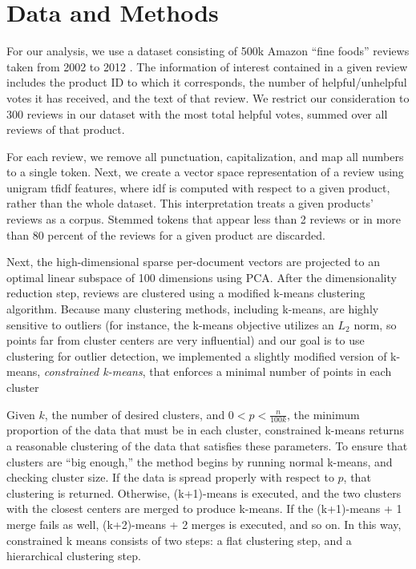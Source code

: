 \documentclass[10pt]{article}
\begin{document}
\section*{Data and Methods}
For our analysis, we use a dataset consisting of 500k Amazon ``fine foods'' reviews taken from 2002 to 2012 \cite{mcauley2013amateurs}. The information of interest contained in a given review includes the product ID to which it corresponds, the number of helpful/unhelpful votes it has received, and the text of that review. We restrict our consideration to 300 reviews in our dataset with the most total helpful votes, summed over all reviews of that product.

For each review, we remove all punctuation, capitalization, and map all numbers to a single token. Next, we create a vector space representation of a review using unigram tfidf features, where idf is computed with respect to a given product, rather than the whole dataset. This interpretation treats a given products' reviews as a corpus. Stemmed tokens that appear less than 2 reviews or in more than 80 percent of the reviews for a given product are discarded.

Next, the high-dimensional sparse per-document vectors are projected to an optimal linear subspace of 100 dimensions using PCA. After the dimensionality reduction step, reviews are clustered using a modified k-means clustering algorithm. Because many clustering methods, including k-means, are highly sensitive to outliers (for instance, the k-means objective utilizes an $L_2$ norm, so points far from cluster centers are very influential) and our goal is to use clustering for outlier detection, we implemented a slightly modified version of k-means, \emph{constrained k-means}, that enforces a minimal number of points in each cluster

Given $k$, the number of desired clusters, and $0 < p < \frac{n}{100k}$, the minimum proportion of the data that must be in each cluster, constrained k-means returns a reasonable clustering of the data that satisfies these parameters. To ensure that clusters are ``big enough,'' the method begins by running normal k-means, and checking cluster size. If the data is spread properly with respect to $p$, that clustering is returned. Otherwise, (k+1)-means is executed, and the two clusters with the closest centers are merged to produce k-means. If the (k+1)-means + 1 merge fails as well, (k+2)-means + 2 merges is executed, and so on. In this way, constrained k means consists of two steps: a flat clustering step, and a hierarchical clustering step.
\end{document}
